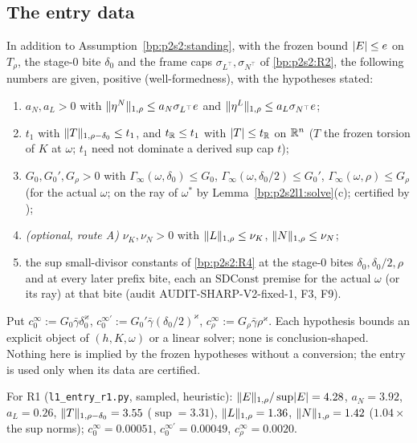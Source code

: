 \subsection{The entry data}\label{bp:p2s2l1:sec-data}

\begin{assumption}\label{bp:p2s2l1:data}
In addition to Assumption~\ref{bp:p2s2:standing}, with the frozen bound $\lvert E\rvert\le e$ on $T_\rho$, the stage-$0$ bite $\delta_0$ and the frame caps
$\sigma_{L^\top},\sigma_{N^\top}$ of \ref{bp:p2s2:R2}, the following numbers are given, positive (well-formedness), with the hypotheses stated:
\begin{enumerate}[label=(L\arabic*)]
\item\label{bp:p2s2l1:L1} $a_N,a_L>0$ with $\lVert \eta^N\rVert_{1,\rho}\le a_N\sigma_{L^\top}e$ and $\lVert \eta^L\rVert_{1,\rho}\le a_L\sigma_{N^\top}e$;
\item\label{bp:p2s2l1:L2} $t_1$ with $\lVert T\rVert_{1,\rho-\delta_0}\le t_1$, and $t_{\mathbb{R}}\le t_1$ with $\lvert T\rvert\le t_{\mathbb{R}}$ on $\mathbb{R}^n$ ($T$ the frozen torsion of $K$ at $\omega$; $t_1$ need not
  dominate a derived sup cap $t$);
\item\label{bp:p2s2l1:L3} $G_0,G_0',G_\rho>0$ with $\Gamma_\infty(\omega,\delta_0)\le G_0$, $\Gamma_\infty(\omega,\delta_0/2)\le G_0'$, $\Gamma_\infty(\omega,\rho)\le G_\rho$ (for the actual
  $\omega$; on the ray of $\omega^*$ by Lemma~\ref{bp:p2s2l1:solve}(c); certified by );
\item\label{bp:p2s2l1:L4} \emph{(optional, route A)} $\nu_K,\nu_N>0$ with $\lVert L\rVert_{1,\rho}\le\nu_K$, $\lVert N\rVert_{1,\rho}\le\nu_N$;
\item\label{bp:p2s2l1:L5} the sup small-divisor constants of \ref{bp:p2s2:R4} at the stage-$0$ bites $\delta_0,\delta_0/2,\rho$ and at every later prefix bite,
  each an $\mathrm{SDConst}$ premise for the actual $\omega$ (or its ray) at that bite (audit AUDIT-SHARP-V2-fixed-1, F3, F9).
\end{enumerate}
Put $c^\infty_0:=G_0\bar\gamma\delta_0^\varkappa$, $c^{\infty\prime}_0:=G_0'\bar\gamma(\delta_0/2)^\varkappa$, $c^\infty_\rho:=G_\rho\bar\gamma\rho^\varkappa$. Each hypothesis bounds an explicit
object of $(h,K,\omega)$ or a linear solver; none is conclusion-shaped. Nothing here is implied by the frozen hypotheses without a conversion;
the entry is used only when its data are certified.
\end{assumption}

For R1 (\texttt{l1\_entry\_r1.py}, sampled, heuristic): $\lVert E\rVert_{1,\rho}/\sup\lvert E\rvert=4.28$, $a_N=3.92$, $a_L=0.26$, $\lVert T\rVert_{1,\rho-\delta_0}=3.55$
($\sup=3.31$), $\lVert L\rVert_{1,\rho}=1.36$, $\lVert N\rVert_{1,\rho}=1.42$ ($1.04\times$ the sup norms); $c^\infty_0=0.00051$, $c^{\infty\prime}_0=0.00049$, $c^\infty_\rho=0.0020$.

